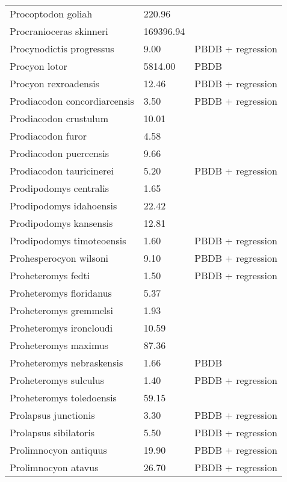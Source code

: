 \begin{longtable}{p{} p{} p{}}
    Procoptodon goliah & 220.96 & \cite{Smith2004} \\ 
    Procranioceras skinneri & 169396.94 & \cite{Tomiya2013} \\ 
    Procynodictis progressus & 9.00 & PBDB + regression \\ 
    Procyon lotor & 5814.00 & PBDB \\ 
    Procyon rexroadensis & 12.46 & PBDB + regression \\ 
    Prodiacodon concordiarcensis & 3.50 & PBDB + regression \\ 
    Prodiacodon crustulum & 10.01 & \cite{Lim2001} \\ 
    Prodiacodon furor & 4.58 & \cite{Scott1937} \\ 
    Prodiacodon puercensis & 9.66 & \cite{Mellett1969} \\ 
    Prodiacodon tauricinerei & 5.20 & PBDB + regression \\ 
    Prodipodomys centralis & 1.65 & \cite{Becker1981} \\ 
    Prodipodomys idahoensis & 22.42 & \cite{Tomiya2013} \\ 
    Prodipodomys kansensis & 12.81 & \cite{Tomiya2013} \\ 
    Prodipodomys timoteoensis & 1.60 & PBDB + regression \\ 
    Prohesperocyon wilsoni & 9.10 & PBDB + regression \\ 
    Proheteromys fedti & 1.50 & PBDB + regression \\ 
    Proheteromys floridanus & 5.37 & \cite{Tomiya2013} \\ 
    Proheteromys gremmelsi & 1.93 & \cite{Becker1981} \\ 
    Proheteromys ironcloudi & 10.59 & \cite{Tomiya2013} \\ 
    Proheteromys maximus & 87.36 & \cite{Tomiya2013} \\ 
    Proheteromys nebraskensis & 1.66 & PBDB \\ 
    Proheteromys sulculus & 1.40 & PBDB + regression \\ 
    Proheteromys toledoensis & 59.15 & \cite{Tomiya2013} \\ 
    Prolapsus junctionis & 3.30 & PBDB + regression \\ 
    Prolapsus sibilatoris & 5.50 & PBDB + regression \\ 
    Prolimnocyon antiquus & 19.90 & PBDB + regression \\ 
    Prolimnocyon atavus & 26.70 & PBDB + regression \\ 

\end{longtable}
